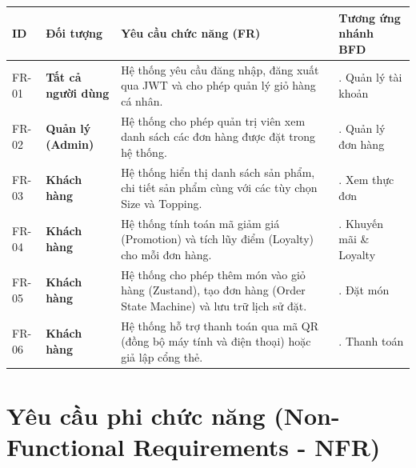 \small
\begin{tabularx}{\textwidth}{
@{}p{0.8cm}
>{\RaggedRight\arraybackslash\bfseries}p{2.1cm}
>{\RaggedRight\arraybackslash}X
>{\RaggedRight\arraybackslash}p{2.0cm}@{}
}
\toprule
\rowcolor{tableblue}
ID & Đối tượng & Yêu cầu chức năng (FR) &
Tương ứng nhánh BFD \\
\midrule

FR-01 &
Tất cả người dùng &
Hệ thống yêu cầu đăng nhập, đăng xuất qua JWT và cho phép
quản lý giỏ hàng cá nhân. &
1. Quản lý tài khoản \\

\midrule

FR-02 &
Quản lý (Admin) &
Hệ thống cho phép quản trị viên xem danh sách các đơn hàng
được đặt trong hệ thống. &
1. Quản lý đơn hàng \\

\midrule

FR-03 &
Khách hàng &
Hệ thống hiển thị danh sách sản phẩm, chi tiết sản phẩm 
cùng với các tùy chọn Size và Topping. &
2. Xem thực đơn \\

\midrule

FR-04 &
Khách hàng &
Hệ thống tính toán mã giảm giá (Promotion) và 
tích lũy điểm (Loyalty) cho mỗi đơn hàng. &
3. Khuyến mãi \& Loyalty \\

\midrule

FR-05 &
Khách hàng &
Hệ thống cho phép thêm món vào giỏ hàng (Zustand),
tạo đơn hàng (Order State Machine) và lưu trữ lịch sử đặt. &
4. Đặt món \\

\midrule

FR-06 &
Khách hàng &
Hệ thống hỗ trợ thanh toán qua mã QR (đồng bộ máy tính và điện thoại) 
hoặc giả lập cổng thẻ. &
5. Thanh toán \\

\bottomrule
\end{tabularx}
\normalsize


\section{Yêu cầu phi chức năng (Non-Functional Requirements - NFR)}

\vspace{12pt}

